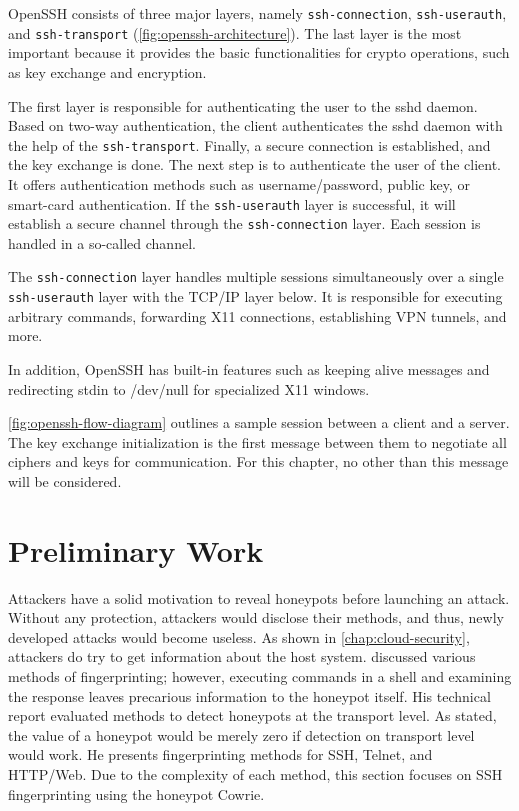 OpenSSH consists of three major layers, namely \verb|ssh-connection|, \verb|ssh-userauth|, and \verb|ssh-transport| (\autoref{fig:openssh-architecture}).
The last layer is the most important because it provides the basic functionalities for crypto operations, such as key exchange and encryption.

The first layer is responsible for authenticating the user to the sshd daemon.
Based on two-way authentication, the client authenticates the sshd daemon with the help of the \verb|ssh-transport|.
Finally, a secure connection is established, and the key exchange is done.
The next step is to authenticate the user of the client.
It offers authentication methods such as username/password, public key, or smart-card authentication.
If the \verb|ssh-userauth| layer is successful, it will establish a secure channel through the \verb|ssh-connection| layer.
Each session is handled in a so-called channel.

The \verb|ssh-connection| layer handles multiple sessions simultaneously over a single \verb|ssh-userauth| layer with the TCP/IP layer below.
It is responsible for executing arbitrary commands, forwarding X11 connections, establishing VPN tunnels, and more.

In addition, OpenSSH has built-in features such as keeping alive messages and redirecting stdin to /dev/null for specialized X11 windows.

\autoref{fig:openssh-flow-diagram} outlines a sample session between a client and a server.
The key exchange initialization is the first message between them to negotiate all ciphers and keys for communication.
For this chapter, no other than this message will be considered.

\section{Preliminary Work}

Attackers have a solid motivation to reveal honeypots before launching an attack.
Without any protection, attackers would disclose their methods, and thus, newly developed attacks would become useless.
As shown in \autoref{chap:cloud-security}, attackers do try to get information about the host system.
\citet{vetterl2020} discussed various methods of fingerprinting; however, executing commands in a shell and examining the response leaves precarious information to the honeypot itself.
His technical report evaluated methods to detect honeypots at the transport level.
As stated, the value of a honeypot would be merely zero if detection on transport level would work.
He presents fingerprinting methods for SSH, Telnet, and HTTP/Web.
Due to the complexity of each method, this section focuses on SSH fingerprinting using the honeypot Cowrie.


